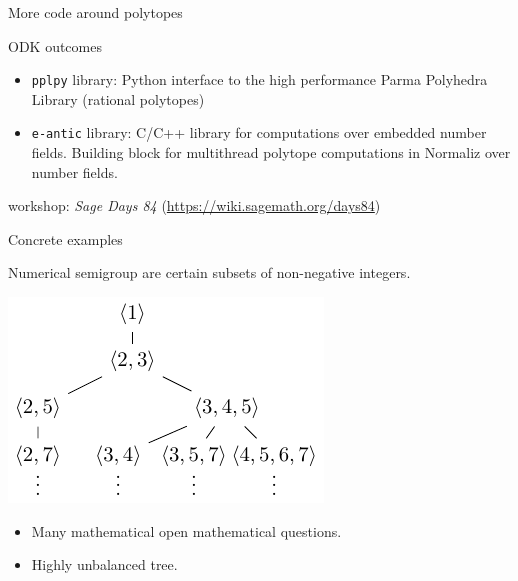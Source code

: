\documentclass{beamer}
\begin{document}
\begin{frame}{More code around polytopes}
  \begin{block}{ODK outcomes}
  \begin{itemize}
  \item \texttt{pplpy} library: Python interface to the high performance
  Parma Polyhedra Library (rational polytopes)
  \item \texttt{e-antic} library: C/C++ library for computations over embedded
  number fields. Building block for multithread polytope computations in Normaliz
  over number fields.
  \end{itemize}
  \end{block}

  workshop: \textit{Sage Days 84} (\url{https://wiki.sagemath.org/days84})
\end{frame}



\begin{frame}{Concrete examples}
  \begin{example}
  Numerical semigroup are certain subsets of non-negative integers.
  \begin{center}%
  \includegraphics{Pictures/semigroups.pdf}%
  \end{center}%
  \end{example}

  \begin{itemize}
  \item Many mathematical open mathematical questions.
  \item Highly unbalanced tree.
  \end{itemize}
\end{frame}
\end{document}
